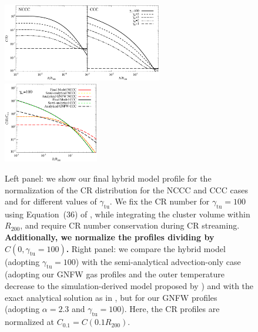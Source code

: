 \documentclass[traditabstract]{aa}
\def\C#1{{\bf #1}}
\newcommand{\rmn}{\mathrm}
\begin{document}
\begin{figure}[t]
\centering
\includegraphics[width=0.62\textwidth]{figures/CR_profiles_FinalModel.eps}
\includegraphics[width=0.37\textwidth]{figures/CR_profiles_FinalModelvsREX_norm0.1.eps}
\caption{Left panel: we show our final hybrid model profile for the
  normalization of the CR distribution for the NCCC and CCC cases and for
  different values of $\gamma_{\rmn{tu}}$. We fix the CR number for
  $\gamma_{\rmn{tu}}=100$ using Equation~(36) of \cite{2011A&A...527A..99E},
  while integrating the cluster volume within $R_{200}$, and require CR number
  conservation during CR streaming. \C{Additionally, we normalize the profiles
    dividing by $C(0,\gamma_{\rmn{tu}}=100)$.}  Right panel: we compare the
  hybrid model (adopting $\gamma_{\rmn{tu}}=100$) with the semi-analytical
  advection-only case (adopting our GNFW gas profiles and the outer temperature
  decrease to the simulation-derived model proposed by
  \citealp{2010MNRAS.409..449P}) and with the exact analytical solution as in
  \citet{2011A&A...527A..99E}, but for our GNFW profiles (adopting $\alpha=2.3$
  and $\gamma_{\rmn{tu}}=100$). Here, the CR profiles are normalized at
  $C_{0.1}=C(0.1R_{200})$.}
\label{fig:CRFinalModel}
\end{figure}
\end{document}
